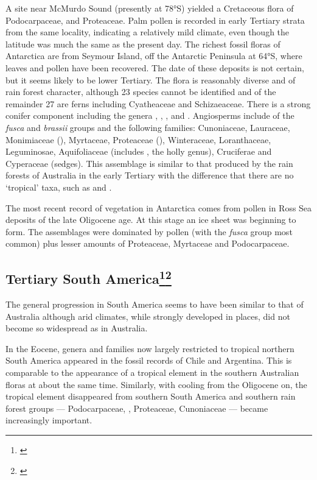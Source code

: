 A site near McMurdo Sound (presently at \ang{78}S) yielded a Cretaceous flora of Podocarpaceae,  and Proteaceae.
Palm pollen is recorded in early Tertiary strata from the same locality, indicating a relatively mild climate, even though the latitude was much the same as the present day.
The richest fossil floras of Antarctica are from Seymour Island, off the Antarctic Peninsula at \ang{64}S, where leaves and pollen have been recovered.
The date of these deposits is not certain, but it seems likely to be lower Tertiary.
The flora is reasonably diverse and of rain forest character, although 23 species cannot be identified and of the remainder 27 are ferns including Cyatheaceae and Schizaeaceae.
There is a strong conifer component including the genera , , ,  and .
Angiosperms include  of the \emph{fusca} and \emph{brassii} groups and the following families: Cunoniaceae, Lauraceae, Monimiaceae (), Myrtaceae, Proteaceae (), Winteraceae, Loranthaceae, Leguminosae, Aquifoliaceae (includes , the holly genus), Cruciferae and Cyperaceae (sedges).
This assemblage is similar to that produced by the rain forests of Australia in the early Tertiary with the difference that there are no `tropical' taxa, such as  and .

The most recent record of vegetation in Antarctica comes from pollen in Ross Sea deposits of the late Oligocene age.
At this stage an ice sheet was beginning to form.
The assemblages were dominated by  pollen (with the \emph{fusca} group most common) plus lesser amounts of Proteaceae, Myrtaceae and Podocarpaceae.

\subsection[Tertiary South America]{Tertiary South America\thinspace\footnote{\cite{wace1965vascular}}\footnote{\cite{kemp1978tertiary}}}

The general progression in South America seems to have been similar to that of Australia although arid climates, while strongly developed in places, did not become so widespread as in Australia.

In the Eocene, genera and families now largely restricted to tropical northern South America appeared in the fossil records of Chile and Argentina.
This is comparable to the appearance of a tropical element in the southern Australian floras at about the same time.
Similarly, with cooling from the Oligocene on, the tropical element disappeared from southern South America and southern rain forest groups --- Podocarpaceae, , Proteaceae, Cunoniaceae --- became increasingly important.

